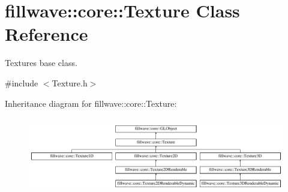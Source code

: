 \hypertarget{classfillwave_1_1core_1_1Texture}{}\section{fillwave\+:\+:core\+:\+:Texture Class Reference}
\label{classfillwave_1_1core_1_1Texture}


Textures base class.  




{\ttfamily \#include $<$Texture.\+h$>$}

Inheritance diagram for fillwave\+:\+:core\+:\+:Texture\+:\begin{figure}[H]
\begin{center}
\leavevmode
\includegraphics[height=3.418803cm]{classfillwave_1_1core_1_1Texture}
\end{center}
\end{figure}
